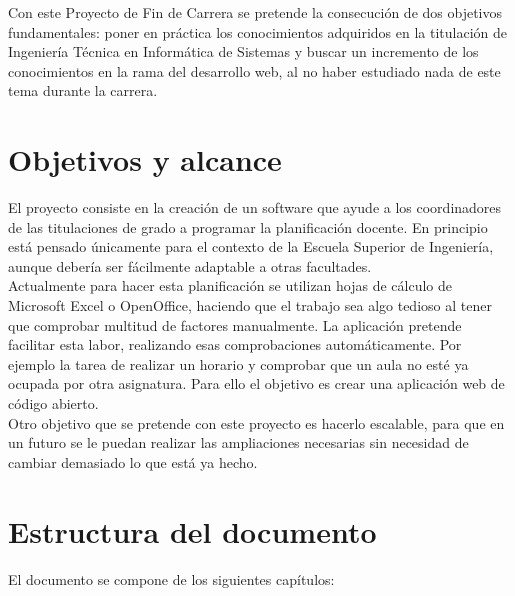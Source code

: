 

Con este Proyecto de Fin de Carrera se pretende la consecución de dos objetivos fundamentales: poner en práctica los conocimientos adquiridos en la titulación de Ingeniería Técnica en Informática de Sistemas y buscar un incremento de los conocimientos en la rama del desarrollo web, al no haber estudiado nada de este tema durante la carrera. \\

\section{Objetivos y alcance}

El proyecto consiste en la creación de un software que ayude a los coordinadores de las titulaciones de grado a programar la planificación docente. En principio está pensado únicamente para el contexto de la Escuela Superior de Ingeniería, aunque debería ser fácilmente adaptable a otras facultades. \\

Actualmente para hacer esta planificación se utilizan hojas de cálculo de Microsoft Excel o OpenOffice, haciendo que el trabajo sea algo tedioso al tener que comprobar multitud de factores manualmente. La aplicación pretende facilitar esta labor, realizando esas comprobaciones automáticamente. Por ejemplo la tarea de realizar un horario y comprobar que un aula no esté ya ocupada por otra asignatura. Para ello el objetivo es crear una aplicación web de código abierto.\\

Otro objetivo que se pretende con este proyecto es hacerlo escalable, para que en un futuro se le puedan realizar las ampliaciones necesarias sin necesidad de cambiar demasiado lo que está ya hecho.

\section{Estructura del documento}

El documento se compone de los siguientes capítulos:

